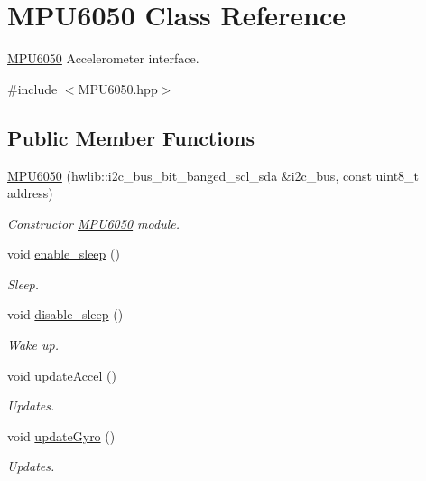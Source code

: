 \hypertarget{classMPU6050}{}\section{M\+P\+U6050 Class Reference}
\label{classMPU6050}


\hyperlink{classMPU6050}{M\+P\+U6050} Accelerometer interface.  




{\ttfamily \#include $<$M\+P\+U6050.\+hpp$>$}

\subsection*{Public Member Functions}
\begin{DoxyCompactItemize}
\item 
\hyperlink{classMPU6050_a7a445f8f9ae82bc06a6ab791d17f2cb3}{M\+P\+U6050} (hwlib\+::i2c\+\_\+bus\+\_\+bit\+\_\+banged\+\_\+scl\+\_\+sda \&i2c\+\_\+bus, const uint8\+\_\+t address)
\begin{DoxyCompactList}\small\item\em Constructor \hyperlink{classMPU6050}{M\+P\+U6050} module. \end{DoxyCompactList}\item 
void \hyperlink{classMPU6050_ad980ebc85c0e817561d1fcf5eaa9deaf}{enable\+\_\+sleep} ()
\begin{DoxyCompactList}\small\item\em Sleep. \end{DoxyCompactList}\item 
void \hyperlink{classMPU6050_a65c24f3e10f6833cda834d6c892a7e97}{disable\+\_\+sleep} ()
\begin{DoxyCompactList}\small\item\em Wake up. \end{DoxyCompactList}\item 
void \hyperlink{classMPU6050_a6b8c79ef52fecb044d2b45632ec8ae5b}{update\+Accel} ()
\begin{DoxyCompactList}\small\item\em Updates. \end{DoxyCompactList}\item 
void \hyperlink{classMPU6050_a306d02443c09814b573bd8597d1670c0}{update\+Gyro} ()
\begin{DoxyCompactList}\small\item\em Updates. \end{DoxyCompactList}\item 

\end{DoxyCompactItemize}
